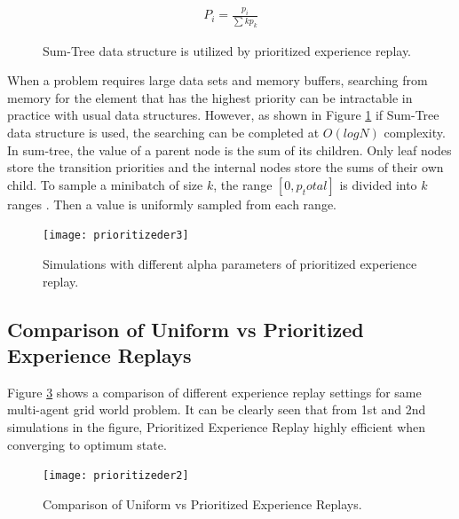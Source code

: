 \documentclass{ituphdreport}
\begin{document}
\begin{equation}
\begin{aligned}
P_i = \frac{p_i}{\sum{k}{}p_k}
\end{aligned}
\end{equation}

\begin{figure}[h]
	\begin{center}
	\end{center}
	\caption{Sum-Tree data structure is utilized by prioritized experience replay.
		\label{fig:sumtree}}
\end{figure}


When a problem requires large data sets and memory buffers, searching from memory for the element that has the highest priority can be intractable in practice with usual data structures.  However,  as shown in Figure \ref{fig:sumtree} if Sum-Tree data structure is used, the searching can be completed at $O(logN)$ complexity. In sum-tree, the value of a parent node is the sum of its children. Only leaf nodes store the transition priorities and the internal nodes store the sums of their own child. To sample a minibatch of size $k$, the range $[0, p_total]$ is divided into $k$ ranges \cite{schaul2015prioritized}. Then a value is uniformly sampled from each range.

\begin{figure}[h]
	\begin{center}
		\texttt{[image: prioritizeder3]}
	\end{center}
	\caption{Simulations with different alpha parameters of prioritized experience replay.
		\label{fig:prioritizeder3}}
\end{figure}

\subsection{Comparison of Uniform vs Prioritized Experience Replays}
Figure \ref{fig:prioritizeder2} shows a comparison of different experience replay settings for same multi-agent grid world problem. It can be clearly seen that from 1st and 2nd simulations in the figure, Prioritized Experience Replay highly efficient when converging to optimum state. 

\begin{figure}[h]
	\begin{center}
		\texttt{[image: prioritizeder2]}
	\end{center}
	\caption{Comparison of Uniform vs Prioritized Experience Replays.
		\label{fig:prioritizeder2}}
\end{figure}
\end{document}
